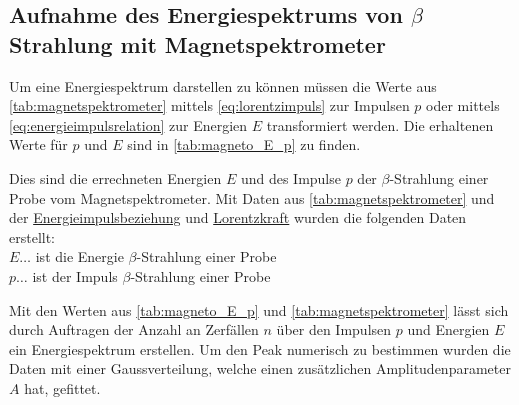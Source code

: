 \documentclass[12pt,english,ngerman]{scrartcl}
\begin{document}
\subsection{Aufnahme des Energiespektrums von \texorpdfstring{$\beta$}{beta}
Strahlung mit Magnetspektrometer}

Um eine Energiespektrum darstellen zu können müssen die Werte aus
\autoref{tab:magnetspektrometer} mittels \autoref{eq:lorentzimpuls} zur
Impulsen $p$ oder mittels \autoref{eq:energieimpulsrelation} zur Energien $E$
transformiert werden. Die erhaltenen Werte für $p$ und $E$ sind in
\autoref{tab:magneto_E_p} zu finden.

\begin{table}[H]
  \caption[Energie- und Impulswerte der $\beta$-Strahlung einer  Probe]{Dies sind
    die errechneten Energien $E$ und des Impulse $p$ der $\beta$-Strahlung einer
     Probe vom Magnetspektrometer. Mit Daten aus
    \autoref{tab:magnetspektrometer} und der
    \hyperref[eq:energieimpulsrelation]{Energieimpulsbeziehung} und
    \hyperref[eq:lorentzimpuls]{Lorentzkraft} wurden die folgenden Daten
    erstellt:\\
    $E \dots$ ist die Energie $\beta$-Strahlung einer  Probe\\
    $p \dots$ ist der Impuls $\beta$-Strahlung einer  Probe\\
}
  \label{tab:magneto_E_p}
  \centering
  
\end{table}

Mit den Werten aus \autoref{tab:magneto_E_p} und
\autoref{tab:magnetspektrometer} lässt sich durch Auftragen der Anzahl an
Zerfällen $n$ über den Impulsen $p$ und Energien $E$ ein Energiespektrum
erstellen. Um den Peak numerisch zu bestimmen wurden die Daten mit einer
Gaussverteilung, welche einen zusätzlichen Amplitudenparameter $A$ hat,
gefittet.
\end{document}
